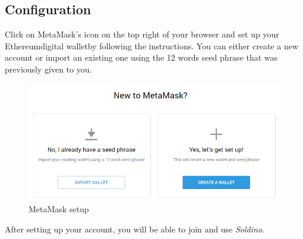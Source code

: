 	\subsection{Configuration}
	Click on MetaMask's icon on the top right of your browser and set up your 
	Ethereum\glosp digital wallet\glosp by following the instructions. You can either 
	create a new account or import an existing one using the 12 words seed phrase
	that was previously given to you.
	\begin{figure}[H]
		\includegraphics[width=15cm]{res/images/metamask_select.png}
		\centering
		\caption{MetaMask setup}
	\end{figure}
	\noindent After setting up your account, you will be able to join and use 
	\textit{Soldino}.
